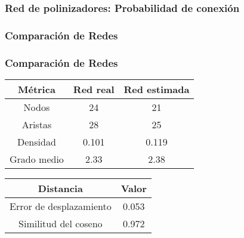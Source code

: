 \begin{frame}
    \frametitle{Red de polinizadores: Probabilidad de conexión}
    \begin{center}
    \end{center}
\end{frame}
    

\begin{frame}
    \frametitle{Comparación de Redes}
    \begin{center}
    \end{center}
\end{frame}

\begin{frame}
    \frametitle{Comparación de Redes}
    \vspace*{-0.2cm}

    \begin{center}\small
        \begin{tabular}{@{}ccc@{}}
            \toprule
                  \textbf{Métrica} & \textbf{Red real}  &  \textbf{Red estimada}\\ 
            \midrule
                Nodos &  24 &  21 \\
                Aristas &  28 &  25 \\
                Densidad &  0.101 &  0.119 \\
                Grado medio & 2.33 & 2.38 \\
            \bottomrule
            \end{tabular}
    \end{center}

    \begin{center}\small
    \begin{tabular}{@{}cc@{}}
    \toprule
    \textbf{Distancia} & \textbf{Valor} \\
    \midrule
    Error de desplazamiento & 0.053 \\
    Similitud del coseno & 0.972 \\
    \bottomrule
    \end{tabular}
    \end{center}

\end{frame}

    
